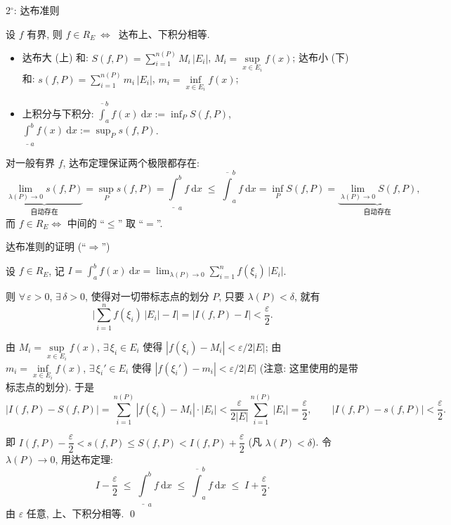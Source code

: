 \begin{frame}{2$^\circ$: 达布准则}

\begin{thm}[达布准则]
设 $f$ 有界, 则 $f \in R_E \ \Longleftrightarrow\ $ 达布上、下积分相等.
\end{thm}

\begin{itemize}
\item 达布大 (上) 和: $S(f, P) = \sum_{i=1}^{n(P)} M_i\, |E_i|$,
  $M_i = \sup\limits_{x \in E_i} f(x)$; \quad
  达布小 (下) 和: $s(f, P) = \sum_{i=1}^{n(P)} m_i\, |E_i|$,
  $m_i = \inf\limits_{x \in E_i} f(x)$;
\item 上积分与下积分:
$\displaystyle \overline{\int}_a^b f(x) ~ \mathrm{d} x := \inf_P S(f, P)$,
$\displaystyle \underline{\int}_a^b f(x) ~ \mathrm{d} x := \sup_P s(f, P)$.
\end{itemize}

\pause

对一般有界 $f$, \alert{达布定理}保证两个极限都存在:
\[
\underbrace{\lim_{\lambda(P) \to 0} s(f, P)}_{\text{自动存在}}
= \sup_P s(f, P)
= \underline{\int}_a^b f ~ \mathrm{d} x
\;\leqslant\;
\overline{\int}_a^b f ~ \mathrm{d} x
= \inf_P S(f, P)
= \underbrace{\lim_{\lambda(P) \to 0} S(f, P)}_{\text{自动存在}} ,
\]
而 $f \in R_E \Longleftrightarrow$ 中间的 ``$\leqslant$'' 取 ``$=$''.

\end{frame}


\begin{frame}{达布准则的证明 (``$\Rightarrow$'')}

设 $f \in R_E$, 记 $I = \displaystyle \int_a^b f(x) ~ \mathrm{d} x
= \lim_{\lambda(P) \to 0} \sum_{i=1}^{n} f(\xi_i)\, |E_i|$.

\pause

则 $\forall\, \varepsilon > 0$, $\exists\, \delta > 0$, 使得对一切带标志点的划分 $P$,
只要 $\lambda(P) < \delta$, 就有
\[
\Big| \sum_{i=1}^{n} f(\xi_i)\, |E_i| - I \Big| = |I(f, P) - I| < \frac{\varepsilon}{2} .
\]

由 $M_i = \sup\limits_{x \in E_i} f(x)$, $\exists\, \xi_i \in E_i$ 使得
$|f(\xi_i) - M_i| < \varepsilon / 2|E|$;
由 $m_i = \inf\limits_{x \in E_i} f(x)$, $\exists\, \xi_i' \in E_i$ 使得
$|f(\xi_i') - m_i| < \varepsilon / 2|E|$
(\alert{注意: 这里使用的是带标志点的划分}). 于是
\[
|I(f, P) - S(f, P)|
= \sum_{i=1}^{n(P)} |f(\xi_i) - M_i| \cdot |E_i|
< \frac{\varepsilon}{2|E|} \sum_{i=1}^{n(P)} |E_i| = \frac{\varepsilon}{2},
\qquad
|I(f, P) - s(f, P)| < \frac{\varepsilon}{2} .
\]

\pause

即 $I(f, P) - \dfrac{\varepsilon}{2} < s(f, P) \leqslant S(f, P) < I(f, P) + \dfrac{\varepsilon}{2}$
(凡 $\lambda(P) < \delta$). 令 $\lambda(P) \to 0$, 用达布定理:
\[
I - \frac{\varepsilon}{2}
\;\leqslant\;
\underline{\int}_a^b f ~ \mathrm{d} x
\;\leqslant\;
\overline{\int}_a^b f ~ \mathrm{d} x
\;\leqslant\;
I + \frac{\varepsilon}{2} .
\]
由 $\varepsilon$ 任意, 上、下积分相等.
\qed

\end{frame}

